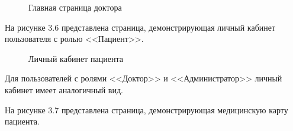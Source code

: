 \begin{figure}[!h]
	\caption{Главная страница доктора}
\end{figure}

На рисунке 3.6 представлена страница, демонстрирующая личный кабинет пользователя с ролью <<Пациент>>.

\begin{figure}[!h]
	\caption{Личный кабинет пациента}
\end{figure}

Для пользователей с ролями <<Доктор>> и <<Администратор>> личный кабинет имеет аналогичный вид.

\clearpage

На рисунке 3.7 представлена страница, демонстрирующая медицинскую карту пациента.

